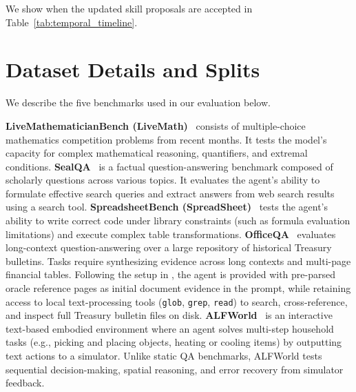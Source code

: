 \documentclass[11pt, a4paper, copyright, gr]{google}
\begin{document}
We show when the updated skill proposals are accepted in Table~\ref{tab:temporal_timeline}.



\section{Dataset Details and Splits}
\label{appendix:datasets}

We describe the five benchmarks used in our evaluation below.

\textbf{LiveMathematicianBench (LiveMath)}~\citep{he2026livemathematicianbench} consists of multiple-choice mathematics competition problems from recent months. It tests the model's capacity for complex mathematical reasoning, quantifiers, and extremal conditions. \textbf{SealQA}~\citep{pham2026sealqa} is a factual question-answering benchmark composed of scholarly questions across various topics. It evaluates the agent's ability to formulate effective search queries and extract answers from web search results using a search tool. \textbf{SpreadsheetBench (SpreadSheet)}~\citep{ma2024spreadsheetbench} tests the agent's ability to write correct code under library constraints (such as formula evaluation limitations) and execute complex table transformations. \textbf{OfficeQA}~\citep{singhvi2025officeqa} evaluates long-context question-answering over a large repository of historical Treasury bulletins. Tasks require synthesizing evidence across long contexts and multi-page financial tables. Following the setup in \citet{yang2026skillopt}, the agent is provided with pre-parsed oracle reference pages as initial document evidence in the prompt, while retaining access to local text-processing tools (\texttt{glob}, \texttt{grep}, \texttt{read}) to search, cross-reference, and inspect full Treasury bulletin files on disk. \textbf{ALFWorld}~\citep{shridhar2021alfworld} is an interactive text-based embodied environment where an agent solves multi-step household tasks (e.g., picking and placing objects, heating or cooling items) by outputting text actions to a simulator. Unlike static QA benchmarks, ALFWorld tests sequential decision-making, spatial reasoning, and error recovery from simulator feedback.
\end{document}
